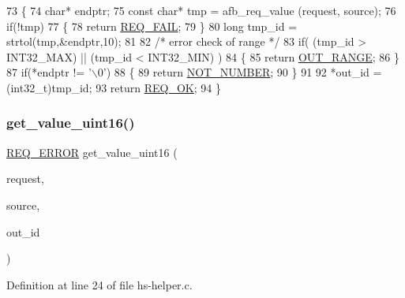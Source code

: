 \begin{DoxyCode}
73 \{
74     \textcolor{keywordtype}{char}* endptr;
75     \textcolor{keyword}{const} \textcolor{keywordtype}{char}* tmp = afb\_req\_value (request, source);
76     \textcolor{keywordflow}{if}(!tmp)
77     \{
78         \textcolor{keywordflow}{return} \hyperlink{hs-helper_8h_aa49f1dbbf26f01627a5737cf43aad899a96a855966bc63045222b3dcac524cee1}{REQ\_FAIL};
79     \}
80     \textcolor{keywordtype}{long} tmp\_id = strtol(tmp,&endptr,10);
81 
82     \textcolor{comment}{/* error check of range */}
83     \textcolor{keywordflow}{if}( (tmp\_id > INT32\_MAX) || (tmp\_id < INT32\_MIN) )
84     \{
85         \textcolor{keywordflow}{return} \hyperlink{hs-helper_8h_aa49f1dbbf26f01627a5737cf43aad899add1c84bf80c5f80741ee8f37fef1e12b}{OUT\_RANGE};
86     \}
87     \textcolor{keywordflow}{if}(*endptr != \textcolor{charliteral}{'\(\backslash\)0'})
88     \{
89         \textcolor{keywordflow}{return} \hyperlink{hs-helper_8h_aa49f1dbbf26f01627a5737cf43aad899aa223eed65c9bee2bf1f4cdecaf90d66a}{NOT\_NUMBER};
90     \}
91 
92     *out\_id = (int32\_t)tmp\_id;
93     \textcolor{keywordflow}{return} \hyperlink{hs-helper_8h_aa49f1dbbf26f01627a5737cf43aad899ab093abb14c097b3b7719debb04d5e8ee}{REQ\_OK};
94 \}
\end{DoxyCode}
\mbox{\label{hs-helper_8h_a649900645417f2df3a70b9ad67529f53}} 
\subsubsection{\texorpdfstring{get\+\_\+value\+\_\+uint16()}{get\_value\_uint16()}}
{\footnotesize\ttfamily \hyperlink{hs-helper_8h_aa49f1dbbf26f01627a5737cf43aad899}{R\+E\+Q\+\_\+\+E\+R\+R\+OR} get\+\_\+value\+\_\+uint16 (\begin{DoxyParamCaption}\item[{const struct afb\+\_\+req}]{request,  }\item[{const char $\ast$}]{source,  }\item[{uint16\+\_\+t $\ast$}]{out\+\_\+id }\end{DoxyParamCaption})}



Definition at line 24 of file hs-\/helper.\+c.


